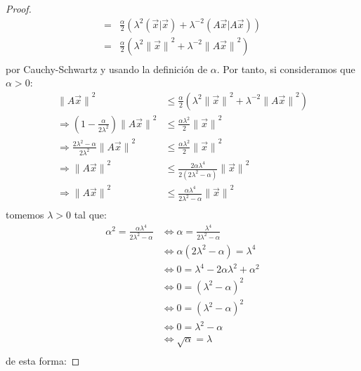 \documentclass[12pt]{report}
\newcounter{it}
\theoremstyle{largebreak}
\newcommand\pint[2]{\ensuremath{\left(#1\big|#2\right)}}
\newcommand\norm[1]{\ensuremath{\|#1\|}}
\begin{document}
\begin{proof}
\begin{equation*}
\begin{split}
                =&\frac{\alpha}{2}(\lambda^2\pint{\vec{x}}{\vec{x}}+\lambda^{-2}\pint{A\vec{x}}{A\vec{x}})\\
                =&\frac{\alpha}{2}(\lambda^2\norm{\vec{x}}^2+\lambda^{-2}\norm{A\vec{x}}^2)\\
            \end{split}
        \end{equation*}
        por Cauchy-Schwartz y usando la definición de $\alpha$. Por tanto, si consideramos que $\alpha>0$:
        \begin{equation*}
            \begin{split}
                \norm{A\vec{x}}^2&\leq\frac{\alpha}{2}(\lambda^2\norm{\vec{x}}^2+\lambda^{-2}\norm{A\vec{x}}^2)\\
                \Rightarrow \left(1-\frac{\alpha}{2\lambda^2}\right)\norm{A\vec{x}}^2&\leq\frac{\alpha\lambda^2}{2}\norm{\vec{x}}^2\\
                \Rightarrow \frac{2\lambda^2-\alpha}{2\lambda^2}\norm{A\vec{x}}^2&\leq\frac{\alpha\lambda^2}{2}\norm{\vec{x}}^2\\
                \Rightarrow \norm{A\vec{x}}^2&\leq\frac{2\alpha\lambda^4}{2(2\lambda^2-\alpha)}\norm{\vec{x}}^2\\
                \Rightarrow \norm{A\vec{x}}^2&\leq\frac{\alpha\lambda^4}{2\lambda^2-\alpha}\norm{\vec{x}}^2\\
            \end{split}
        \end{equation*}
        tomemos $\lambda>0$ tal que:
        \begin{equation*}
            \begin{split}
                \alpha^2=\frac{\alpha\lambda^4}{2\lambda^2-\alpha}&\iff\alpha=\frac{\lambda^4}{2\lambda^2-\alpha}\\
                &\iff\alpha(2\lambda^2-\alpha)=\lambda^4\\
                &\iff0=\lambda^4-2\alpha\lambda^2+\alpha^2\\
                &\iff0=\left(\lambda^2-\alpha\right)^2 \\
                &\iff0=\left(\lambda^2-\alpha\right)^2 \\
                &\iff0=\lambda^2-\alpha \\
                &\iff\sqrt{\alpha}=\lambda \\
            \end{split}
        \end{equation*}
        de esta forma:

\end{proof}
\end{document}
